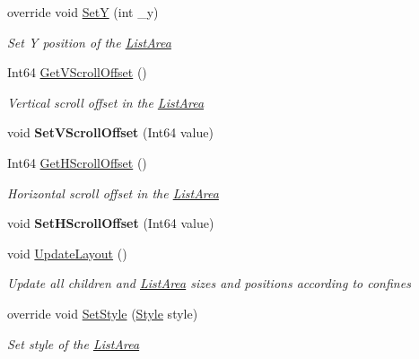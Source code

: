 \begin{DoxyCompactItemize}
override void \mbox{\hyperlink{class_space_v_i_l_1_1_list_area_a0c0974eca2621188c88ba752a5f62a1a}{SetY}} (int \+\_\+y)
\begin{DoxyCompactList}\small\item\em Set Y position of the \mbox{\hyperlink{class_space_v_i_l_1_1_list_area}{List\+Area}} \end{DoxyCompactList}\item 
Int64 \mbox{\hyperlink{class_space_v_i_l_1_1_list_area_aa7af82dde87cb38962fcf14378ebe39f}{Get\+V\+Scroll\+Offset}} ()
\begin{DoxyCompactList}\small\item\em Vertical scroll offset in the \mbox{\hyperlink{class_space_v_i_l_1_1_list_area}{List\+Area}} \end{DoxyCompactList}\item 
\mbox{\label{class_space_v_i_l_1_1_list_area_aefc3de6f9419d56cdd7c00c3da7c135c}} 
void {\bfseries Set\+V\+Scroll\+Offset} (Int64 value)
\item 
Int64 \mbox{\hyperlink{class_space_v_i_l_1_1_list_area_afa9d172433e60b22c5220c06acff38fd}{Get\+H\+Scroll\+Offset}} ()
\begin{DoxyCompactList}\small\item\em Horizontal scroll offset in the \mbox{\hyperlink{class_space_v_i_l_1_1_list_area}{List\+Area}} \end{DoxyCompactList}\item 
\mbox{\label{class_space_v_i_l_1_1_list_area_a6af19a0f18ea5a2d28f2ad17605d155a}} 
void {\bfseries Set\+H\+Scroll\+Offset} (Int64 value)
\item 
void \mbox{\hyperlink{class_space_v_i_l_1_1_list_area_af0fb95222910f6e85274a38dfa506174}{Update\+Layout}} ()
\begin{DoxyCompactList}\small\item\em Update all children and \mbox{\hyperlink{class_space_v_i_l_1_1_list_area}{List\+Area}} sizes and positions according to confines \end{DoxyCompactList}\item 
override void \mbox{\hyperlink{class_space_v_i_l_1_1_list_area_a04902026e7956980b7dce5bff22d082c}{Set\+Style}} (\mbox{\hyperlink{class_space_v_i_l_1_1_decorations_1_1_style}{Style}} style)
\begin{DoxyCompactList}\small\item\em Set style of the \mbox{\hyperlink{class_space_v_i_l_1_1_list_area}{List\+Area}} \end{DoxyCompactList}\end{DoxyCompactItemize}
